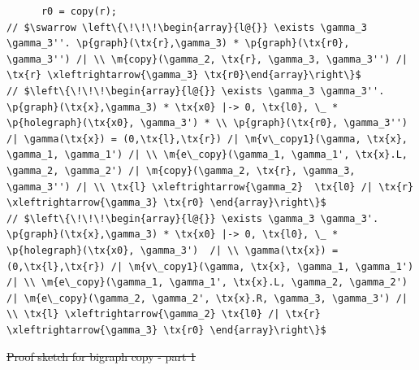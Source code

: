 \documentclass[acmsmall,screen]{acmart}  %
\newcommand{\tx}[1]{\text{#1}}
\newcommand{\p}[1]{\ensuremath{\mathsf{#1}}} \newcommand{\m}[1]{\ensuremath{\mathit{#1}}} \newcommand{\ma}[1]{\ensuremath{\mathcal{#1}}} \let\ramify\lightning
\providecommand{\DIFdel}[1]{{\protect\color{red}\sout{#1}}}                      %
\providecommand{\DIFdelFL}[1]{\DIFdel{#1}} %
\begin{document}
\begin{lstlisting}
      r0 = copy(r);
// $\swarrow \left\{\!\!\!\begin{array}{l@{}} \exists \gamma_3 \gamma_3''. \p{graph}(\tx{r},\gamma_3) * \p{graph}(\tx{r0}, \gamma_3'') /| \\ \m{copy}(\gamma_2, \tx{r}, \gamma_3, \gamma_3'') /| \tx{r} \xleftrightarrow{\gamma_3} \tx{r0}\end{array}\right\}$
// $\left\{\!\!\!\begin{array}{l@{}} \exists \gamma_3 \gamma_3''. \p{graph}(\tx{x},\gamma_3) * \tx{x0} |-> 0, \tx{l0}, \_ * \p{holegraph}(\tx{x0}, \gamma_3') * \\ \p{graph}(\tx{r0}, \gamma_3'')  /| \gamma(\tx{x}) = (0,\tx{l},\tx{r}) /| \m{v\_copy1}(\gamma, \tx{x}, \gamma_1, \gamma_1') /| \\ \m{e\_copy}(\gamma_1, \gamma_1', \tx{x}.L, \gamma_2, \gamma_2') /| \m{copy}(\gamma_2, \tx{r}, \gamma_3, \gamma_3'') /| \\ \tx{l} \xleftrightarrow{\gamma_2}  \tx{l0} /| \tx{r} \xleftrightarrow{\gamma_3} \tx{r0} \end{array}\right\}$
// $\left\{\!\!\!\begin{array}{l@{}} \exists \gamma_3 \gamma_3'. \p{graph}(\tx{x},\gamma_3) * \tx{x0} |-> 0, \tx{l0}, \_ * \p{holegraph}(\tx{x0}, \gamma_3')  /| \\ \gamma(\tx{x}) = (0,\tx{l},\tx{r}) /| \m{v\_copy1}(\gamma, \tx{x}, \gamma_1, \gamma_1') /| \\ \m{e\_copy}(\gamma_1, \gamma_1', \tx{x}.L, \gamma_2, \gamma_2') /| \m{e\_copy}(\gamma_2, \gamma_2', \tx{x}.R, \gamma_3, \gamma_3') /| \\ \tx{l} \xleftrightarrow{\gamma_2} \tx{l0} /| \tx{r} \xleftrightarrow{\gamma_3} \tx{r0} \end{array}\right\}$
  \end{lstlisting}
{%
\DIFdelFL{Proof sketch for bigraph copy - part 1}}

\end{document}
